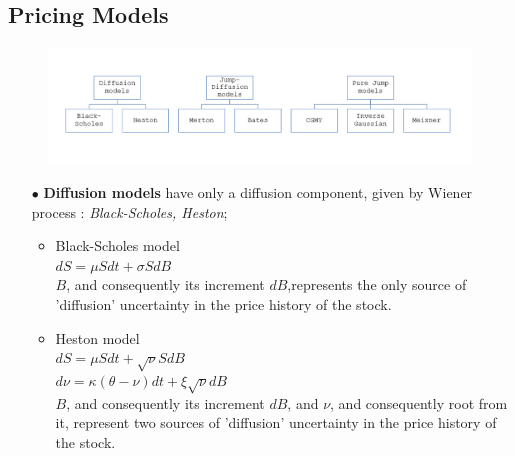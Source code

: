 \documentclass[a4paper]{report}
\begin{document}
\begin{itemize}
\subsection{Pricing Models}



\begin{figure}[H]
    \centering
    \includegraphics[width=\textwidth]{models.png}
\end{figure}


\begin{itemize}
\item[$\bullet$] \textbf{Diffusion models} have only a diffusion component, given by Wiener process : \textit{Black-Scholes, Heston};\\
\begin{itemize}


\item  Black-Scholes model\\
$ dS=\mu S dt + \sigma S dB$\\
$B$, and consequently its increment $dB$,represents the only source of 'diffusion' uncertainty in the price history of the stock.\\


\item Heston model \\
$ dS=\mu S dt + \sqrt{\nu} S dB$\\
$ d\nu = \kappa(\theta-\nu)dt +\xi\sqrt{\nu}dB$\\
$B$, and consequently its increment $dB$, and $\nu$, and consequently root from it, represent two sources of 'diffusion' uncertainty in the price history of the stock.\\
\end{itemize}



\end{itemize}
\end{itemize}
\end{document}

